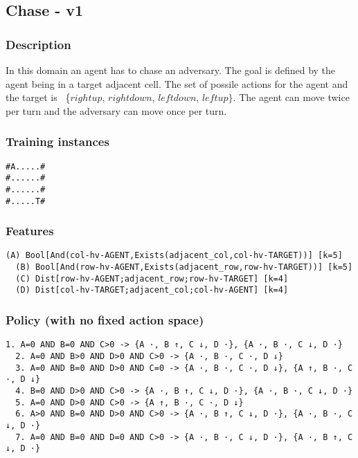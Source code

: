 \documentclass[a4paper]{article}
\begin{document}
\subsection{Chase - v1}
\subsubsection{Description}
In this domain an agent has to chase an adversary. The goal is defined by the agent being in a target adjacent cell. The set of possile actions for the agent and the target is ~\{$rightup$, $rightdown$, $leftdown$, $leftup\}$. The agent can move twice per turn and the adversary can move once per turn.

\subsubsection{Training instances}
\begin{Verbatim}[fontsize=\footnotesize]
#A.....#
#......#
#......#
#.....T#
\end{Verbatim}

\subsubsection{Features}
\begin{Verbatim}[fontsize=\footnotesize]
  (A) Bool[And(col-hv-AGENT,Exists(adjacent_col,col-hv-TARGET))] [k=5]
  (B) Bool[And(row-hv-AGENT,Exists(adjacent_row,row-hv-TARGET))] [k=5]
  (C) Dist[row-hv-AGENT;adjacent_row;row-hv-TARGET] [k=4]
  (D) Dist[col-hv-TARGET;adjacent_col;col-hv-AGENT] [k=4]
\end{Verbatim}

\subsubsection{Policy (with no fixed action space)}
\begin{Verbatim}[fontsize=\footnotesize]
  1. A=0 AND B=0 AND C>0 -> {A ·, B ↑, C ↓, D ·}, {A ·, B ·, C ↓, D ·}
  2. A=0 AND B>0 AND D>0 AND C>0 -> {A ·, B ·, C ·, D ↓}
  3. A=0 AND B=0 AND D>0 AND C=0 -> {A ·, B ·, C ·, D ↓}, {A ↑, B ·, C ·, D ↓}
  4. B=0 AND D>0 AND C>0 -> {A ·, B ↑, C ↓, D ·}, {A ·, B ·, C ↓, D ·}
  5. A=0 AND D>0 AND C>0 -> {A ↑, B ·, C ·, D ↓}
  6. A>0 AND B=0 AND D>0 AND C>0 -> {A ·, B ↑, C ↓, D ·}, {A ·, B ·, C ↓, D ·}
  7. A=0 AND B=0 AND D=0 AND C>0 -> {A ·, B ·, C ↓, D ·}, {A ·, B ↑, C ↓, D ·}

\end{Verbatim}
\end{document}
